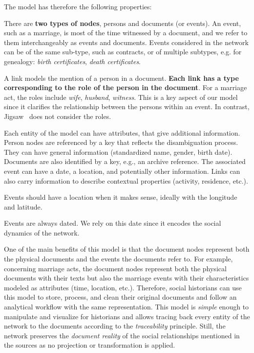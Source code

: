 The model has therefore the following properties:
\begin{description}[nosep,leftmargin=2mm]
    \item[{Bipartite:}] There are \textbf{two types of nodes}, persons and documents (or events). An event, such as a marriage, is most of the time witnessed by a document, and we refer to them interchangeably as events and documents. Events considered in the network can be of the same sub-type, such as contracts, or of multiple subtypes, e.g. for genealogy: \emph{birth certificates}, \emph{death certificates}.
    \item[Links and Roles:] A link models the mention of a person in a document. \textbf{Each link has a type corresponding to the role of the person in the document}. For a marriage act, the roles include \emph{wife}, \emph{husband}, \emph{witness}. This is a key aspect of our model since it clarifies the relationship between the persons within an event. In contrast, Jigsaw~\cite{staskoJigsawSupportingInvestigative2008} does not consider the roles.
    \item[{Multivariate:}] Each entity of the model can have attributes, that give additional information. Person nodes are referenced by a key that reflects the disambiguation process. They can have general information (standardized name, gender, birth date). Documents are also identified by a key, e.g., an archive reference. The associated event can have a date, a location, and potentially other information. Links can also carry information to describe contextual properties (activity, residence, etc.).
    \item[{Geolocated:}] Events should have a location when it makes sense, ideally with the longitude and latitude.
    \item[{Dynamic:}] Events are always dated. We rely on this date since it encodes the social dynamics of the network.
\end{description}

One of the main benefits of this model is that the document nodes represent both the physical documents and the events the documents refer to.
For example, concerning marriage acts, the document nodes represent both the physical documents with their texts but also the marriage events with their characteristics modeled as attributes (time, location, etc.).
Therefore, social historians can use this model to store, process, and clean their original documents and follow an analytical workflow with the same representation.
This model is \textit{simple} enough to manipulate and visualize for historians and allows tracing back every entity of the network to the documents according to the \textit{traceability} principle.
Still, the network preserves the \textit{document reality} of the social relationships mentioned in the sources as no projection or transformation is applied.


